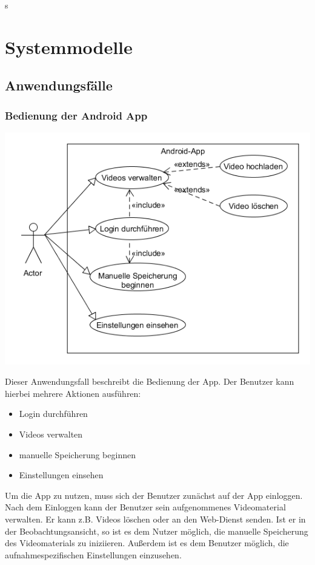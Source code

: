 s\chapter{Systemmodelle}
\section{Anwendungsfälle}
\subsection{Bedienung der Android App}
\begin{center}
\includegraphics[width=1\textwidth]{subtopicsFuncspec/Res/systemModels/App-AFD-UML.png}
\end{center}
Dieser Anwendungsfall beschreibt die Bedienung der \gls{App}. 
Der Benutzer kann hierbei mehrere Aktionen ausführen:
\begin{itemize}
\itemsep0pt
\item Login durchführen
\item Videos verwalten
\item manuelle Speicherung beginnen
\item Einstellungen einsehen
\end{itemize}
Um die \gls{App} zu nutzen, muss sich der Benutzer zunächst auf der \gls{App} einloggen. Nach dem Einloggen kann der Benutzer sein aufgenommenes Videomaterial verwalten. Er kann z.B. Videos löschen oder an den \gls{Web-Dienst} senden.
Ist er in der Beobachtungsansicht, so ist es dem Nutzer möglich, die manuelle Speicherung des Videomaterials zu iniziieren. Außerdem ist es dem Benutzer möglich, die aufnahmespezifischen Einstellungen einzusehen.

